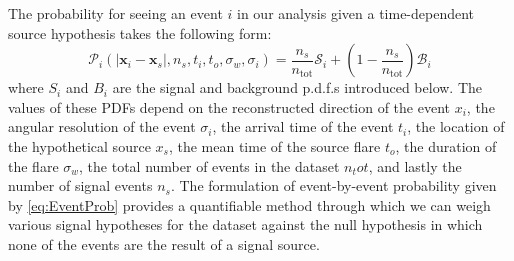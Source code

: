 \documentclass{gatech-thesis}
\begin{document}
The probability for seeing an event $i$ in our analysis given a time-dependent source hypothesis takes the following form:
\begin{equation}\label{eq:EventProb}
\mathcal{P}_i(|\mathbf{x}_i-\mathbf{x}_s|,n_s,t_i,t_o,\sigma_w,\sigma_i) = \frac{n_s}{n_{\mathrm{tot}}} \mathcal{S}_i + \left(1-\frac{n_s}{n_{\mathrm{tot}}}\right) \mathcal{B}_i
\end{equation}
where $S_i$ and $B_i$ are the signal and background p.d.f.s introduced below. The values of these PDFs depend on the reconstructed direction of the event \textbf{$x_i$}, the angular resolution of the event $\sigma_i$, the arrival time of the event $t_i$, the location of the hypothetical source \textbf{$x_s$}, the mean time of the source flare $t_o$, the duration of the flare $\sigma_w$, the total number of events in the dataset $n_tot$, and lastly the number of signal events $n_s$. The formulation of event-by-event probability given by \ref{eq:EventProb} provides a quantifiable method through which we can weigh various signal hypotheses for the dataset against the null hypothesis in which none of the events are the result of a signal source.
\end{document}
